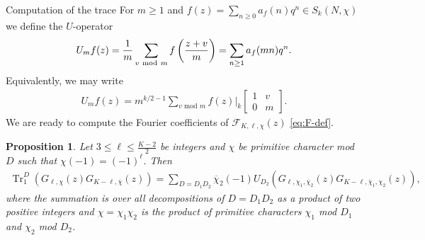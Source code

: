 \documentclass[11pt,letterpaper,reqno]{amsart}
\makeatletter
\numberwithin{figure}{section}
\numberwithin{table}{section}
\theoremstyle{definition}
\theoremstyle{plain}
\newtheorem{proposition}[theorem]{Proposition}
\theoremstyle{definition}
\theoremstyle{definition}
\theoremstyle{remark}
\numberwithin{equation}{section}
\theoremstyle{remark}
\DeclareMathOperator{\Tr}{Tr}
\def\subsection{\@startsection{subsection}{2}%
  \z@{.5\linespacing\@plus.7\linespacing}{.3\linespacing}%
  {\normalfont\bfseries}}
\makeatother
\begin{document}
\subsection{Computation of the trace}\label{subsect:computationofFourier}
For $m\geq1$ and $f(z)=\sum_{n\geq0}a_f(n)q^n\in S_{k}(N,\chi)$ we define the $U$-operator
\begin{align}
    U_mf(z)=\frac{1}{m}\sum_{v~{\rm mod}~m}f\left(\frac{z+v}{m}\right)=\sum_{n\geq1}a_f(mn)q^n.\label{eq:defofUmap}
\end{align}
Equivalently, we may write 
\begin{align}U_mf(z)=m^{k/2-1}\sum_{v\text{ mod }m}f(z)\bigg|_k\begin{bmatrix}
    1 & v\\ 0& m
\end{bmatrix}.\label{eq:defofUslash}\end{align} 
We are ready to compute the Fourier coefficients of $\mathcal{F}_{K,\ell,\chi}(z)$ \eqref{eq:F-def}. 
\begin{proposition}\label{prop:Trislifting}
    Let $3\leq \ell\leq \frac{K-2}{2}$ be integers and  $\chi$ be primitive character mod $D$ such that $\chi(-1)=(-1)^{\ell}$. Then
    \begin{align}
        \Tr^D_1(G_{\ell,\chi}(z)G_{K-\ell,\overline{\chi}}(z))=\sum_{D=D_1D_2}\overline{\chi}_2(-1)U_{D_2}(G_{\ell,\chi_1,\overline{\chi}_{2}}(z)G_{K-\ell,\overline{\chi}_{1},\chi_2}(z)),   \nonumber
    \end{align}
    where the summation is over all decompositions of $D=D_1D_2$ as a product of two positive integers and $\chi=\chi_1\chi_2$ is the product of primitive characters $\chi_1$ mod $D_1$ and $\chi_2$ mod $D_2$.
\end{proposition}
\end{document}
